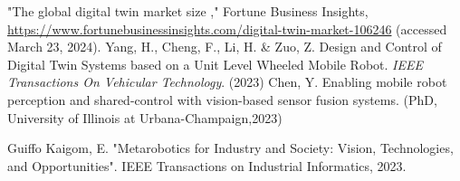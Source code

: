 \documentclass[conference]{IEEEtran}
\begin{document}
\begin{thebibliography}{00}
"The global digital twin market size ," Fortune Business Insights, \url{https://www.fortunebusinessinsights.com/digital-twin-market-106246} (accessed March 23, 2024).
Yang, H., Cheng, F., Li, H. \& Zuo, Z. Design and Control of Digital Twin Systems based on a Unit Level Wheeled Mobile Robot. {\em IEEE Transactions On Vehicular Technology}. (2023)
Chen, Y. Enabling mobile robot perception and shared-control with vision-based sensor fusion systems. (PhD, University of Illinois at Urbana-Champaign,2023)

Guiffo Kaigom, E.  "Metarobotics for Industry and Society: Vision, Technologies, and Opportunities". IEEE Transactions on Industrial Informatics, 2023.





\end{thebibliography}
\end{document}
